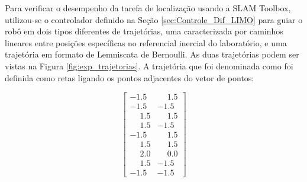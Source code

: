 Para verificar o desempenho da tarefa de localização usando a SLAM Toolbox, utilizou-se o controlador definido na Seção \ref{sec:Controle_Dif_LIMO} para guiar o robô em dois tipos diferentes de trajetórias, uma caracterizada por caminhos lineares entre posições específicas no referencial inercial do laboratório, e uma trajetória em formato de Lemniscata de Bernoulli. As duas trajetórias podem ser vistas na Figura \ref{fig:exp_trajetorias}. A trajetória que foi denominada como  foi definida como retas ligando os pontos adjacentes do vetor de pontos: 

\begin{equation}
    \begin{bmatrix}
        -1.5 & \phantom{-}1.5\\ 
        -1.5 & -1.5 \\ 
        \phantom{-}1.5 & \phantom{-}1.5 \\ 
         \phantom{-}1.5 & -1.5 \\ 
        -1.5 & \phantom{-}1.5 \\
        \phantom{-}1.5 & \phantom{-}1.5 \\
        \phantom{-}2.0 & \phantom{-}0.0 \\
        \phantom{-}1.5 & -1.5 \\
        -1.5 & -1.5
    \end{bmatrix}
\end{equation}

